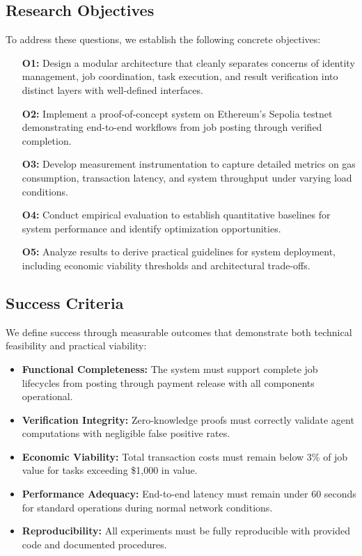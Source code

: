 \subsection{Research Objectives}

To address these questions, we establish the following concrete objectives:

\begin{enumerate}
    \item[\textbf{O1:}] Design a modular architecture that cleanly separates concerns of identity management, job coordination, task execution, and result verification into distinct layers with well-defined interfaces.
    
    \item[\textbf{O2:}] Implement a proof-of-concept system on Ethereum's Sepolia testnet demonstrating end-to-end workflows from job posting through verified completion.
    
    \item[\textbf{O3:}] Develop measurement instrumentation to capture detailed metrics on gas consumption, transaction latency, and system throughput under varying load conditions.
    
    \item[\textbf{O4:}] Conduct empirical evaluation to establish quantitative baselines for system performance and identify optimization opportunities.
    
    \item[\textbf{O5:}] Analyze results to derive practical guidelines for system deployment, including economic viability thresholds and architectural trade-offs.
\end{enumerate}

\subsection{Success Criteria}

We define success through measurable outcomes that demonstrate both technical feasibility and practical viability:

\begin{itemize}
    \item \textbf{Functional Completeness:} The system must support complete job lifecycles from posting through payment release with all components operational.
    \item \textbf{Verification Integrity:} Zero-knowledge proofs must correctly validate agent computations with negligible false positive rates.
    \item \textbf{Economic Viability:} Total transaction costs must remain below 3\% of job value for tasks exceeding \$1,000 in value.
    \item \textbf{Performance Adequacy:} End-to-end latency must remain under 60 seconds for standard operations during normal network conditions.
    \item \textbf{Reproducibility:} All experiments must be fully reproducible with provided code and documented procedures.
\end{itemize}

